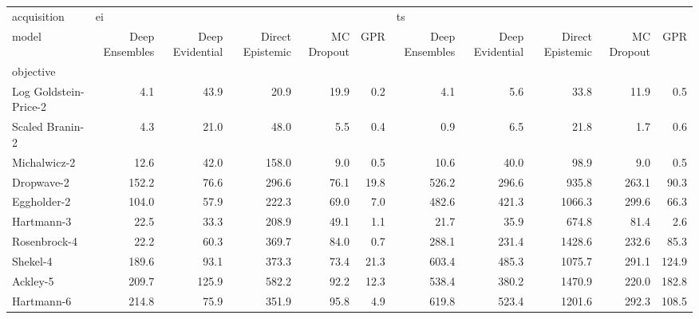 \begin{tabular}{lrrrrrrrrrr}
\toprule
acquisition & \multicolumn{5}{l}{ei} & \multicolumn{5}{l}{ts} \\
model & Deep Ensembles & Deep Evidential & Direct Epistemic & MC Dropout &   GPR & Deep Ensembles & Deep Evidential & Direct Epistemic & MC Dropout &    GPR \\
objective             &                &                 &                  &            &       &                &                 &                  &            &        \\
\midrule
Log Goldstein-Price-2 &            4.1 &            43.9 &             20.9 &       19.9 &   0.2 &            4.1 &             5.6 &             33.8 &       11.9 &    0.5 \\
Scaled Branin-2       &            4.3 &            21.0 &             48.0 &        5.5 &   0.4 &            0.9 &             6.5 &             21.8 &        1.7 &    0.6 \\
Michalwicz-2          &           12.6 &            42.0 &            158.0 &        9.0 &   0.5 &           10.6 &            40.0 &             98.9 &        9.0 &    0.5 \\
Dropwave-2            &          152.2 &            76.6 &            296.6 &       76.1 &  19.8 &          526.2 &           296.6 &            935.8 &      263.1 &   90.3 \\
Eggholder-2           &          104.0 &            57.9 &            222.3 &       69.0 &   7.0 &          482.6 &           421.3 &           1066.3 &      299.6 &   66.3 \\
Hartmann-3            &           22.5 &            33.3 &            208.9 &       49.1 &   1.1 &           21.7 &            35.9 &            674.8 &       81.4 &    2.6 \\
Rosenbrock-4          &           22.2 &            60.3 &            369.7 &       84.0 &   0.7 &          288.1 &           231.4 &           1428.6 &      232.6 &   85.3 \\
Shekel-4              &          189.6 &            93.1 &            373.3 &       73.4 &  21.3 &          603.4 &           485.3 &           1075.7 &      291.1 &  124.9 \\
Ackley-5              &          209.7 &           125.9 &            582.2 &       92.2 &  12.3 &          538.4 &           380.2 &           1470.9 &      220.0 &  182.8 \\
Hartmann-6            &          214.8 &            75.9 &            351.9 &       95.8 &   4.9 &          619.8 &           523.4 &           1201.6 &      292.3 &  108.5 \\
\bottomrule
\end{tabular}
